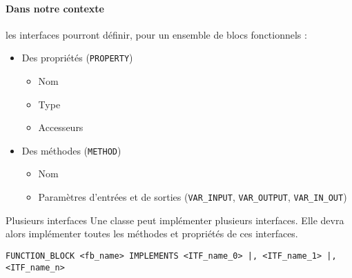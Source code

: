 \paragraph{Dans notre contexte} les interfaces pourront définir, pour un ensemble de blocs fonctionnels : 
\begin{itemize}
    \item Des propriétés (\lstinline{PROPERTY})
    \begin{itemize}
        \item Nom
        \item Type
        \item Accesseurs
    \end{itemize}
    \item Des méthodes (\lstinline{METHOD})
    \begin{itemize}
        \item Nom
        \item Paramètres d'entrées et de sorties (\lstinline{VAR_INPUT}, \lstinline{VAR_OUTPUT}, \lstinline{VAR_IN_OUT})
    \end{itemize}
\end{itemize}

\begin{UPSTIinfor}{Plusieurs interfaces}
    Une classe peut implémenter plusieurs interfaces. Elle devra alors implémenter toutes les méthodes et propriétés de ces interfaces.

    \begin{lstlisting}
FUNCTION_BLOCK <fb_name> IMPLEMENTS <ITF_name_0> |, <ITF_name_1> |, <ITF_name_n>
    \end{lstlisting}
\end{UPSTIinfor}


